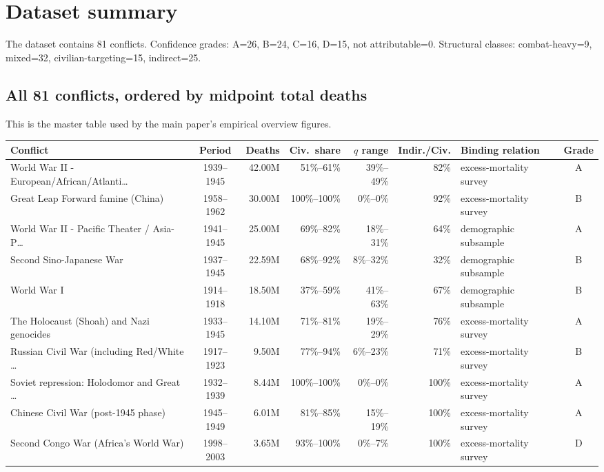 \documentclass[11pt]{article}
\begin{document}
\section{Dataset summary}
The dataset contains 81 conflicts. Confidence grades: A=26, B=24, C=16, D=15, not attributable=0. Structural classes: combat-heavy=9, mixed=32, civilian-targeting=15, indirect=25.

\subsection{All 81 conflicts, ordered by midpoint total deaths}\label{tab:all}
This is the master table used by the main paper's empirical overview figures.
\begin{scriptsize}
\begin{longtable}{p{4.7cm} c r r r r p{2.8cm} c}
\toprule
Conflict & Period & Deaths & Civ.\ share & $q$ range & Indir./Civ. & Binding relation & Grade \\
\midrule
\endhead
World War II - European/African/Atlanti\ldots{} & 1939--1945 & 42.00M & 51\%--61\% & 39\%--49\% & 82\% & excess-mortality survey & A \\
Great Leap Forward famine (China) & 1958--1962 & 30.00M & 100\%--100\% & 0\%--0\% & 92\% & excess-mortality survey & B \\
World War II - Pacific Theater / Asia-P\ldots{} & 1941--1945 & 25.00M & 69\%--82\% & 18\%--31\% & 64\% & demographic subsample & A \\
Second Sino-Japanese War & 1937--1945 & 22.59M & 68\%--92\% & 8\%--32\% & 32\% & demographic subsample & B \\
World War I & 1914--1918 & 18.50M & 37\%--59\% & 41\%--63\% & 67\% & demographic subsample & B \\
The Holocaust (Shoah) and Nazi genocides & 1933--1945 & 14.10M & 71\%--81\% & 19\%--29\% & 76\% & excess-mortality survey & A \\
Russian Civil War (including Red/White \ldots{} & 1917--1923 & 9.50M & 77\%--94\% & 6\%--23\% & 71\% & excess-mortality survey & B \\
Soviet repression: Holodomor and Great \ldots{} & 1932--1939 & 8.44M & 100\%--100\% & 0\%--0\% & 100\% & excess-mortality survey & A \\
Chinese Civil War (post-1945 phase) & 1945--1949 & 6.01M & 81\%--85\% & 15\%--19\% & 100\% & excess-mortality survey & A \\
Second Congo War (Africa's World War) & 1998--2003 & 3.65M & 93\%--100\% & 0\%--7\% & 100\% & excess-mortality survey & D \\

\end{longtable}
\end{scriptsize}
\end{document}
